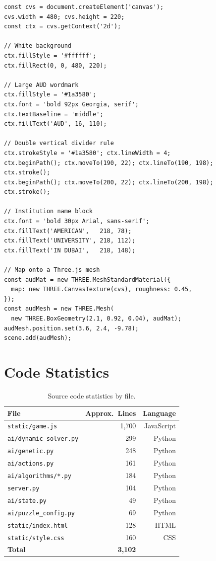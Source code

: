 \documentclass[12pt, a4paper]{report}
\begin{document}
\begin{lstlisting}[style=jsStyle,
  caption={Procedural AUD logo canvas texture (\texttt{static/game.js}).},
  label=lst:audlogo]
const cvs = document.createElement('canvas');
cvs.width = 480; cvs.height = 220;
const ctx = cvs.getContext('2d');

// White background
ctx.fillStyle = '#ffffff';
ctx.fillRect(0, 0, 480, 220);

// Large AUD wordmark
ctx.fillStyle = '#1a3580';
ctx.font = 'bold 92px Georgia, serif';
ctx.textBaseline = 'middle';
ctx.fillText('AUD', 16, 110);

// Double vertical divider rule
ctx.strokeStyle = '#1a3580'; ctx.lineWidth = 4;
ctx.beginPath(); ctx.moveTo(190, 22); ctx.lineTo(190, 198); ctx.stroke();
ctx.beginPath(); ctx.moveTo(200, 22); ctx.lineTo(200, 198); ctx.stroke();

// Institution name block
ctx.font = 'bold 30px Arial, sans-serif';
ctx.fillText('AMERICAN',   218, 78);
ctx.fillText('UNIVERSITY', 218, 112);
ctx.fillText('IN DUBAI',   218, 148);

// Map onto a Three.js mesh
const audMat = new THREE.MeshStandardMaterial({
  map: new THREE.CanvasTexture(cvs), roughness: 0.45,
});
const audMesh = new THREE.Mesh(
  new THREE.BoxGeometry(2.1, 0.92, 0.04), audMat);
audMesh.position.set(3.6, 2.4, -9.78);
scene.add(audMesh);
\end{lstlisting}

\section{Code Statistics}

\begin{table}[H]
\centering
\caption{Source code statistics by file.}
\label{tab:codestats}
\begin{tabular}{lrr}
\toprule
\textbf{File} & \textbf{Approx.\ Lines} & \textbf{Language} \\
\midrule
\texttt{static/game.js}        & 1,700 & JavaScript \\
\texttt{ai/dynamic\_solver.py} &   299 & Python     \\
\texttt{ai/genetic.py}         &   248 & Python     \\
\texttt{ai/actions.py}         &   161 & Python     \\
\texttt{ai/algorithms/*.py}    &   184 & Python     \\
\texttt{server.py}             &   104 & Python     \\
\texttt{ai/state.py}           &    49 & Python     \\
\texttt{ai/puzzle\_config.py}  &    69 & Python     \\
\texttt{static/index.html}     &   128 & HTML       \\
\texttt{static/style.css}      &   160 & CSS        \\
\midrule
\textbf{Total}                 & \textbf{3,102} & \\
\bottomrule
\end{tabular}
\end{table}
\end{document}
